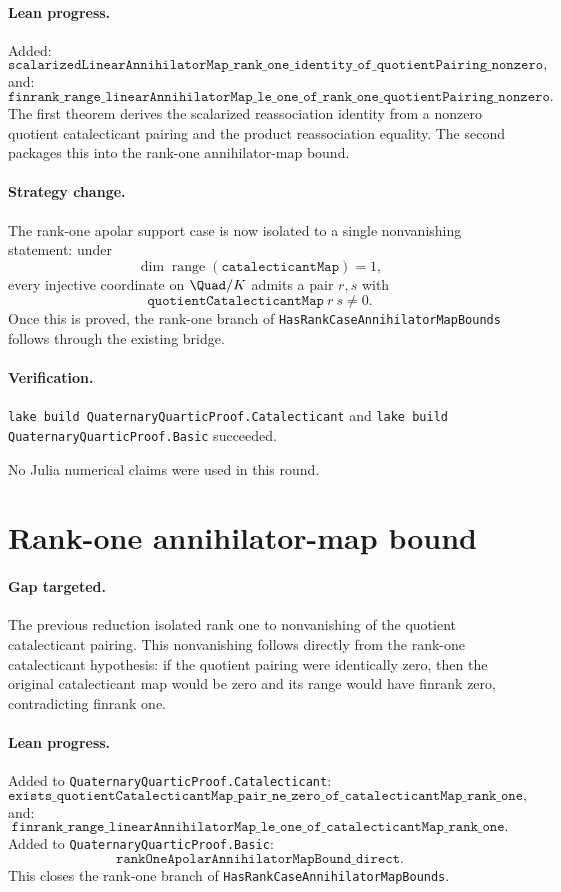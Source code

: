 \documentclass[11pt]{article}
\begin{document}
\paragraph{Lean progress.}
Added:
\[
\texttt{scalarizedLinearAnnihilatorMap\_rank\_one\_identity\_of\_quotientPairing\_nonzero},
\]
and:
\[
\texttt{finrank\_range\_linearAnnihilatorMap\_le\_one\_of\_rank\_one\_quotientPairing\_nonzero}.
\]
The first theorem derives the scalarized reassociation identity from a nonzero
quotient catalecticant pairing and the product reassociation equality.  The
second packages this into the rank-one annihilator-map bound.

\paragraph{Strategy change.}
The rank-one apolar support case is now isolated to a single nonvanishing
statement: under
\[
\dim \operatorname{range}(\texttt{catalecticantMap})=1,
\]
every injective coordinate on \(\Quad/K\) admits a pair \(r,s\) with
\[
\texttt{quotientCatalecticantMap}\ r\ s\ne0.
\]
Once this is proved, the rank-one branch of
\texttt{HasRankCaseAnnihilatorMapBounds} follows through the existing bridge.

\paragraph{Verification.}
\texttt{lake build QuaternaryQuarticProof.Catalecticant} and
\texttt{lake build QuaternaryQuarticProof.Basic} succeeded.

No Julia numerical claims were used in this round.

\section*{Rank-one annihilator-map bound}

\paragraph{Gap targeted.}
The previous reduction isolated rank one to nonvanishing of the quotient
catalecticant pairing.  This nonvanishing follows directly from the rank-one
catalecticant hypothesis: if the quotient pairing were identically zero, then
the original catalecticant map would be zero and its range would have finrank
zero, contradicting finrank one.

\paragraph{Lean progress.}
Added to \texttt{QuaternaryQuarticProof.Catalecticant}:
\[
\texttt{exists\_quotientCatalecticantMap\_pair\_ne\_zero\_of\_catalecticantMap\_rank\_one},
\]
and:
\[
\texttt{finrank\_range\_linearAnnihilatorMap\_le\_one\_of\_catalecticantMap\_rank\_one}.
\]
Added to \texttt{QuaternaryQuarticProof.Basic}:
\[
\texttt{rankOneApolarAnnihilatorMapBound\_direct}.
\]
This closes the rank-one branch of
\texttt{HasRankCaseAnnihilatorMapBounds}.
\end{document}
